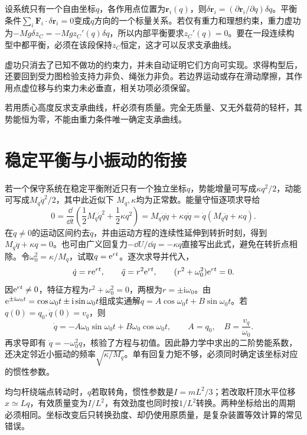 设系统只有一个自由坐标$q$，各作用点位置为$\boldsymbol r_i(q)$，则$\delta\boldsymbol r_i=(\partial\boldsymbol r_i/\partial q)\delta q$。平衡条件$\sum_i\boldsymbol F_i\cdot\delta\boldsymbol r_i=0$变成$q$方向的一个标量关系。若仅有重力和理想约束，重力虚功为$-Mg\delta z_C=-Mg z_C'(q)\delta q$，所以内部平衡要求$z_C'(q)=0$。要在一段连续构型中都平衡，必须在该段保持$z_C$恒定，这才可以反求支承曲线。

虚功只消去了已知不做功的约束力，并未自动证明它们方向可实现。求得构型后，还要回到受力图检验支持力非负、绳张力非负。若边界运动或存在滑动摩擦，其作用点虚位移与约束力未必垂直，相关功项必须保留。

若用质心高度反求支承曲线，杆必须有质量。完全无质量、又无外载荷的轻杆，其势能恒为零，不能由重力条件唯一确定支承曲线。

\section{稳定平衡与小振动的衔接}
若一个保守系统在稳定平衡附近只有一个独立坐标$q$，势能增量可写成$\kappa q^2/2$，动能可写成$M_q\dot q^2/2$，其中此近似下 $M_q,\kappa$均为正常数。能量守恒逐项求导给
\[0=\frac{\dd}{\dd t}\left(\frac12M_q\dot q^2+\frac12\kappa q^2\right)
 =M_q\dot q\ddot q+\kappa q\dot q
 =\dot q(M_q\ddot q+\kappa q).\]
在$\dot q\ne0$的运动区间约去$\dot q$，并由运动方程的连续性延伸到转折时刻，得到$M_q\ddot q+\kappa q=0$。也可由广义回复力$-\dd U/\dd q=-\kappa q$直接写出此式，避免在转折点相除。令$\omega_0^2=\kappa/M_q$，试取$q=\mathrm e^{rt}$。逐次求导并代入，
\[
\dot q=r\mathrm e^{rt},\qquad \ddot q=r^2\mathrm e^{rt},\qquad
(r^2+\omega_0^2)\mathrm e^{rt}=0.
\]
因$\mathrm e^{rt}\ne0$，特征方程为$r^2+\omega_0^2=0$，两根为$r=\pm\mathrm i\omega_0$。由$\mathrm e^{\pm\mathrm i\omega_0t}=\cos\omega_0t\pm\mathrm i\sin\omega_0t$组成实通解$q=A\cos\omega_0t+B\sin\omega_0t$。若$q(0)=q_0,\dot q(0)=v_q$，则
\[\dot q=-A\omega_0\sin\omega_0t+B\omega_0\cos\omega_0t,
 \qquad A=q_0,\quad B=\frac{v_q}{\omega_0}.\]
再求导即有 $\ddot q=-\omega_0^2q$，核验了方程与初值。因此静力学中求出的二阶势能系数，还决定邻近小振动的频率$\sqrt{\kappa/M_q}$。单有回复力矩不够，必须同时确定该坐标对应的惯性参数。

均匀杆绕端点转动时，$q$若取转角，惯性参数是$I=mL^2/3$；若改取杆顶水平位移$x\simeq Lq$，有效质量变为$I/L^2$，有效劲度也同时按$1/L^2$转换。两种坐标给出的周期必须相同。坐标改变后只转换劲度、却仍使用原质量，是复杂装置等效计算的常见错误。

